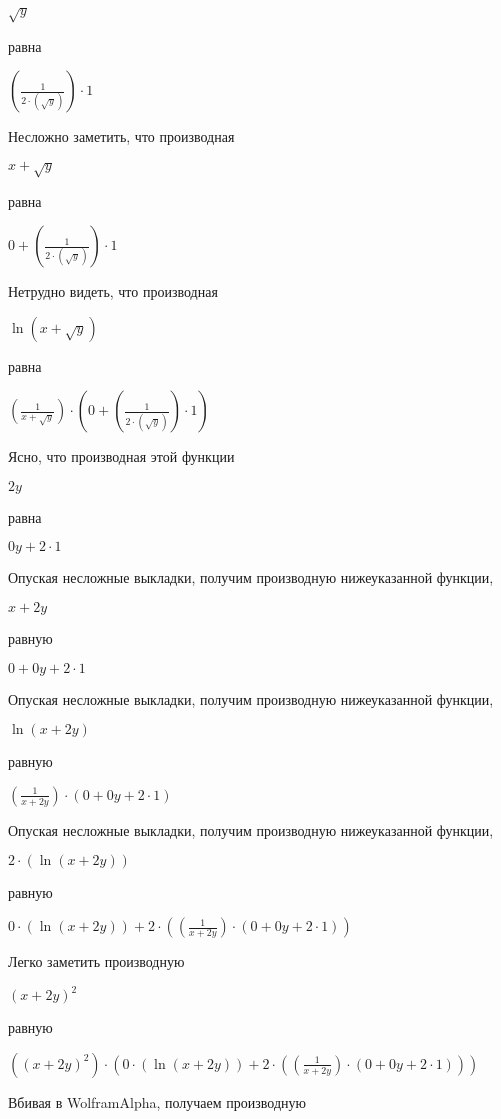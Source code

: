 \documentclass{article}
\theoremstyle{definition}
\begin{document}
\begin{center}$ \sqrt {y}$ \end{center}равна
\begin{center}$(\frac{1}{2 \cdot ( \sqrt {y})}) \cdot 1$ \end{center}Несложно заметить, что производная
\begin{center}$x +  \sqrt {y}$ \end{center}равна
\begin{center}$0 + (\frac{1}{2 \cdot ( \sqrt {y})}) \cdot 1$ \end{center}Нетрудно видеть, что производная
\begin{center}$ \ln (x +  \sqrt {y})$ \end{center}равна
\begin{center}$(\frac{1}{x +  \sqrt {y}}) \cdot (0 + (\frac{1}{2 \cdot ( \sqrt {y})}) \cdot 1)$ \end{center}Ясно, что производная этой функции
\begin{center}$2y$ \end{center}равна
\begin{center}$0y + 2 \cdot 1$ \end{center}Опуская несложные выкладки, получим производную нижеуказанной функции,
\begin{center}$x + 2y$ \end{center}равную
\begin{center}$0 + 0y + 2 \cdot 1$ \end{center}Опуская несложные выкладки, получим производную нижеуказанной функции,
\begin{center}$ \ln (x + 2y)$ \end{center}равную
\begin{center}$(\frac{1}{x + 2y}) \cdot (0 + 0y + 2 \cdot 1)$ \end{center}Опуская несложные выкладки, получим производную нижеуказанной функции,
\begin{center}$2 \cdot ( \ln (x + 2y))$ \end{center}равную
\begin{center}$0 \cdot ( \ln (x + 2y)) + 2 \cdot ((\frac{1}{x + 2y}) \cdot (0 + 0y + 2 \cdot 1))$ \end{center}Легко заметить производную
\begin{center}$(x + 2y) ^ 2$ \end{center}равную
\begin{center}$((x + 2y) ^ 2) \cdot (0 \cdot ( \ln (x + 2y)) + 2 \cdot ((\frac{1}{x + 2y}) \cdot (0 + 0y + 2 \cdot 1)))$ \end{center}Вбивая в WolframAlpha, получаем производную
\end{document}
